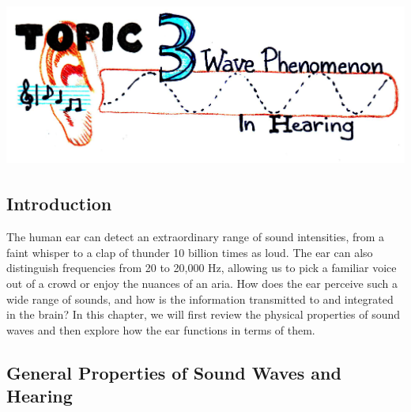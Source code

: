 \setcounter{chapter}{3}
\setcounter{section}{0}
\setcounter{figure}{0}
\setcounter{equation}{0}
\setcounter{table}{0}
\chapter*{\includegraphics[width=\textwidth]{./figures/Topic3/Topic3.jpg}}

\section{Introduction}

The human ear can detect an extraordinary range of sound intensities, from a faint whisper to a clap of thunder 10 billion times as loud.  The ear can also distinguish frequencies from 20 to 20,000 Hz, allowing us to pick a familiar voice out of a crowd or enjoy the nuances of an aria.  How does the ear perceive such a wide range of sounds, and how is the information transmitted to and integrated in the brain?  
In this chapter, we will first review the physical properties of sound waves and then explore how the ear functions in terms of them.

\section{General Properties of Sound Waves and Hearing}

